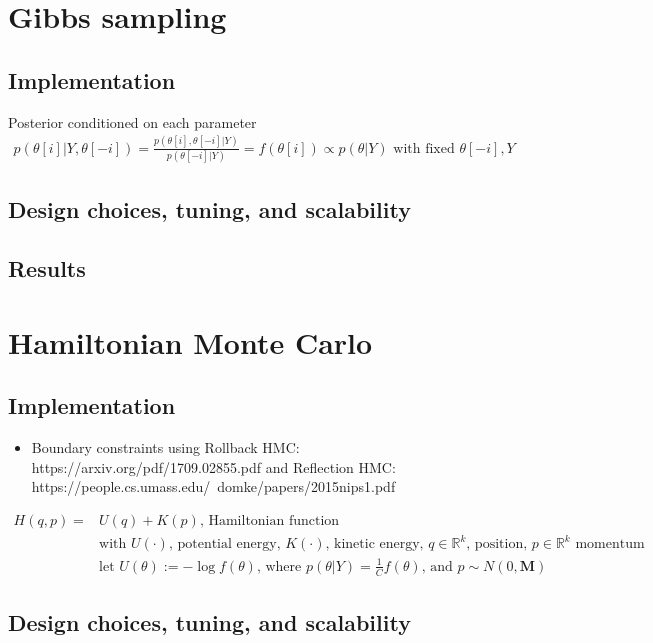 \documentclass{article}
\begin{document}
\section{Gibbs sampling}
\subsection*{Implementation}
Posterior conditioned on each parameter
\begin{align*}
  p(\theta[i] | Y, \theta[-i]) = \frac{p(\theta[i], \theta[-i] | Y)}{p(\theta[-i] | Y)} = f(\theta[i]) \propto p(\theta | Y) \textrm{ with fixed } \theta[-i], Y
\end{align*}

\subsection*{Design choices, tuning, and scalability}
\subsection*{Results}

\section{Hamiltonian Monte Carlo}
\subsection*{Implementation}
\begin{itemize}
  \item Boundary constraints using Rollback HMC: https://arxiv.org/pdf/1709.02855.pdf and Reflection HMC: https://people.cs.umass.edu/~domke/papers/2015nips1.pdf
\end{itemize}

\begin{align*}
  H(q, p) =& U(q) + K(p) \textrm{, Hamiltonian function}\\
  & \textrm{with $U(\cdot)$, potential energy, $K(\cdot)$, kinetic energy, $q \in \mathbb{R}^k$, position, $p \in \mathbb{R}^k$ momentum}\\
  & \textrm{let } U(\theta) := -\log f(\theta) \textrm{, where } p(\theta | Y) = \frac{1}{C}f(\theta) \textrm{, and } p \sim N(0, \textbf{M})
\end{align*}

\subsection*{Design choices, tuning, and scalability}
\end{document}
